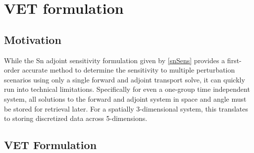 \documentclass{article}
\begin{document}
\section{VET formulation}

\subsection{Motivation} 

While the Sn adjoint sensitivity formulation given by \ref{snSens} provides a first-order accurate method to determine the sensitivity to multiple perturbation scenarios using only a single forward and adjoint transport solve, it can quickly run into technical limitations. Specifically for even a one-group time independent system, all solutions to the forward and adjoint system in space and angle must be stored for retrieval later. For a spatially 3-dimensional system, this translates to storing discretized data across 5-dimensions.


\subsection{VET Formulation}
\end{document}
